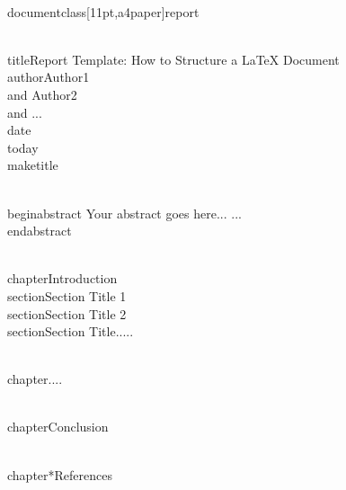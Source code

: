 \\documentclass[11pt,a4paper]{report}\n\n
\begin{document}
\n
\\title{Report Template: How to Structure a LaTeX Document}\n
\\author{Author1 \\and Author2 \\and ...}\n
\\date{\\today}\n
\\maketitle\n\n

\\begin{abstract}\n
Your abstract goes here...\n
...\n
\\end{abstract}\n\n

\\chapter{Introduction}\n
\\section{Section Title 1}\n
\\section{Section Title 2}\n
\\section{Section Title.....}\n\n

\\chapter{....}\n\n

\\chapter{Conclusion}\n\n\n


\\chapter*{References}\n\n

\
\end{document}
